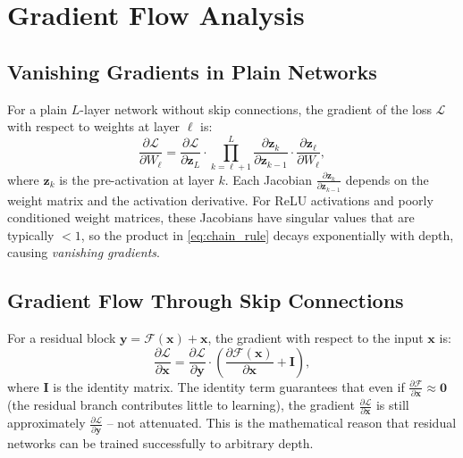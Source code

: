 \documentclass[12pt,a4paper]{article}
\begin{document}
\section{Gradient Flow Analysis}
\label{sec:gradient_flow}

\subsection{Vanishing Gradients in Plain Networks}

For a plain $L$-layer network without skip connections, the gradient of the loss $\mathcal{L}$ with respect to weights at layer $\ell$ is:
\begin{equation}
  \frac{\partial \mathcal{L}}{\partial W_\ell}
  = \frac{\partial \mathcal{L}}{\partial \mathbf{z}_L}
    \cdot \prod_{k=\ell+1}^{L} \frac{\partial \mathbf{z}_k}{\partial \mathbf{z}_{k-1}}
    \cdot \frac{\partial \mathbf{z}_\ell}{\partial W_\ell},
  \label{eq:chain_rule}
\end{equation}
where $\mathbf{z}_k$ is the pre-activation at layer $k$. Each Jacobian $\frac{\partial \mathbf{z}_k}{\partial \mathbf{z}_{k-1}}$ depends on the weight matrix and the activation derivative. For ReLU activations and poorly conditioned weight matrices, these Jacobians have singular values that are typically $< 1$, so the product in \cref{eq:chain_rule} decays exponentially with depth, causing \emph{vanishing gradients}.

\subsection{Gradient Flow Through Skip Connections}

For a residual block $\mathbf{y} = \mathcal{F}(\mathbf{x}) + \mathbf{x}$, the gradient with respect to the input $\mathbf{x}$ is:
\begin{equation}
  \frac{\partial \mathcal{L}}{\partial \mathbf{x}}
  = \frac{\partial \mathcal{L}}{\partial \mathbf{y}}
    \cdot \left(\frac{\partial \mathcal{F}(\mathbf{x})}{\partial \mathbf{x}} + \mathbf{I}\right),
  \label{eq:resgrad}
\end{equation}
where $\mathbf{I}$ is the identity matrix. The identity term guarantees that even if $\frac{\partial \mathcal{F}}{\partial \mathbf{x}} \approx \mathbf{0}$ (the residual branch contributes little to learning), the gradient $\frac{\partial \mathcal{L}}{\partial \mathbf{x}}$ is still approximately $\frac{\partial \mathcal{L}}{\partial \mathbf{y}}$ -- not attenuated. This is the mathematical reason that residual networks can be trained successfully to arbitrary depth.
\end{document}
